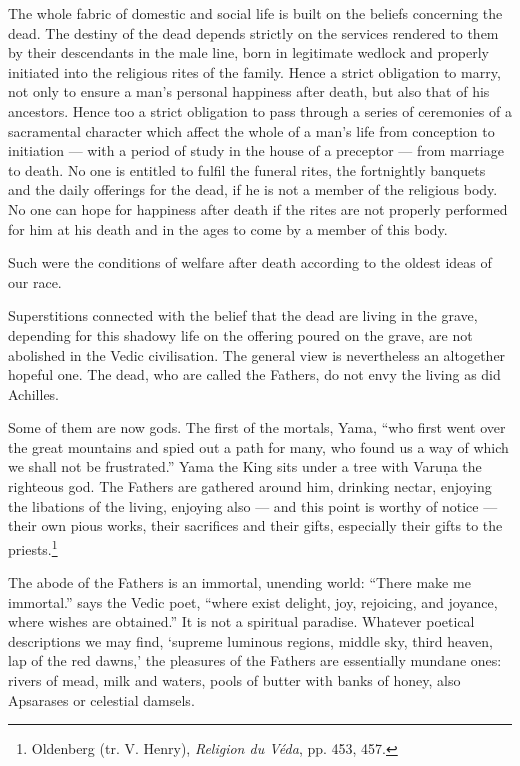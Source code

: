 \documentclass[a4paper, 11pt, oneside, english, landscape]{article}
\begin{document}
The whole fabric of domestic and social life is built on the beliefs concerning the dead. The destiny of the dead depends strictly on the services rendered to them by their descendants in the male line, born in legitimate wedlock and properly initiated into the religious rites of the family. Hence a strict obligation to marry, not only to ensure a man's personal happiness after death, but also that of his ancestors. Hence too a strict obligation to pass through a series of ceremonies of a sacramental character which affect the whole of a man's life from conception to initiation --- with a period of study in the house of a preceptor --- from marriage to death. No one is entitled to fulfil the funeral rites, the fortnightly banquets and the daily offerings for the dead, if he is not a member of the religious body. No one can hope for happiness after death if the rites are not properly performed for him at his death and in the ages to come by a member of this body.

Such were the conditions of welfare after death according to the oldest ideas of our race.

Superstitions connected with the belief that the dead are living in the grave, depending for this shadowy life on the offering poured on the grave, are not abolished in the Vedic civilisation. The general view is nevertheless an altogether hopeful one. The dead, who are called the Fathers, do not envy the living as did Achilles.

Some of them are now gods. The first of the mortals, Yama, ``who first went over the great mountains and spied out a path for many, who found us a way of which we shall not be frustrated.'' Yama the King sits under a tree with Varuṇa the righteous god. The Fathers are gathered around him, drinking nectar, enjoying the libations of the living, enjoying also --- and this point is worthy of notice --- their own pious works, their sacrifices and their gifts, especially their gifts to the priests.\footnote{Oldenberg (tr. V. Henry), \emph{Religion du Véda}, pp. 453, 457.}

The abode of the Fathers is an immortal, unending world: ``There make me immortal.'' says the Vedic poet, ``where exist delight, joy, rejoicing, and joyance, where wishes are obtained.'' It is not a spiritual paradise. Whatever poetical descriptions we may find, `supreme luminous regions, middle sky, third heaven, lap of the red dawns,' the pleasures of the Fathers are essentially mundane ones: rivers of mead, milk and waters, pools of butter with banks of honey, also Apsarases or celestial damsels.
\end{document}
